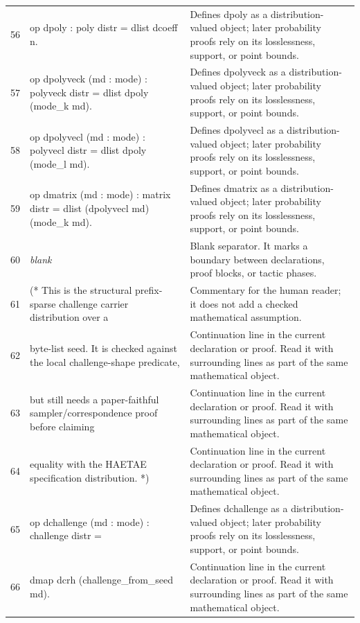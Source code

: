 \documentclass[10pt]{article}
\begin{document}
\begin{longtable}{r L{0.53\textwidth} L{0.37\textwidth}}
56 & {\ttfamily\scriptsize op dpoly : poly distr = dlist dcoeff n.} & Defines dpoly as a distribution-valued object; later probability proofs rely on its losslessness, support, or point bounds. \\
57 & {\ttfamily\scriptsize op dpolyveck (md : mode) : polyveck distr = dlist dpoly (mode\_k md).} & Defines dpolyveck as a distribution-valued object; later probability proofs rely on its losslessness, support, or point bounds. \\
58 & {\ttfamily\scriptsize op dpolyvecl (md : mode) : polyvecl distr = dlist dpoly (mode\_l md).} & Defines dpolyvecl as a distribution-valued object; later probability proofs rely on its losslessness, support, or point bounds. \\
59 & {\ttfamily\scriptsize op dmatrix (md : mode) : matrix distr = dlist (dpolyvecl md) (mode\_k md).} & Defines dmatrix as a distribution-valued object; later probability proofs rely on its losslessness, support, or point bounds. \\
60 & {\ttfamily\scriptsize \emph{blank}} & Blank separator.  It marks a boundary between declarations, proof blocks, or tactic phases. \\
61 & {\ttfamily\scriptsize (* This is the structural prefix-sparse challenge carrier distribution over a} & Commentary for the human reader; it does not add a checked mathematical assumption. \\
62 & {\ttfamily\scriptsize    byte-list seed. It is checked against the local challenge-shape predicate,} & Continuation line in the current declaration or proof.  Read it with surrounding lines as part of the same mathematical object. \\
63 & {\ttfamily\scriptsize    but still needs a paper-faithful sampler/correspondence proof before claiming} & Continuation line in the current declaration or proof.  Read it with surrounding lines as part of the same mathematical object. \\
64 & {\ttfamily\scriptsize    equality with the HAETAE specification distribution. *)} & Continuation line in the current declaration or proof.  Read it with surrounding lines as part of the same mathematical object. \\
65 & {\ttfamily\scriptsize op dchallenge (md : mode) : challenge distr =} & Defines dchallenge as a distribution-valued object; later probability proofs rely on its losslessness, support, or point bounds. \\
66 & {\ttfamily\scriptsize   dmap dcrh (challenge\_from\_seed md).} & Continuation line in the current declaration or proof.  Read it with surrounding lines as part of the same mathematical object. \\

\end{longtable}
\end{document}
